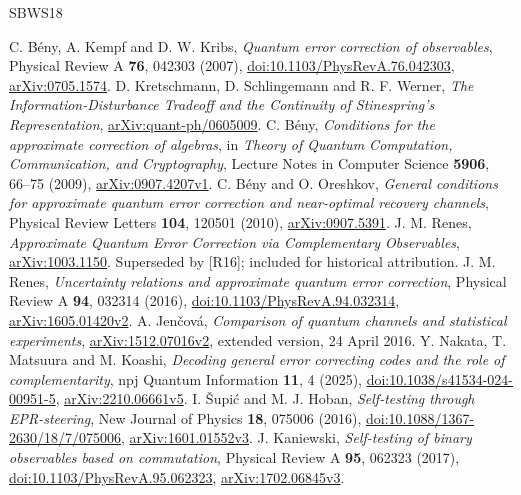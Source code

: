 \documentclass[11pt]{article}
\begin{document}
\begin{thebibliography}{SBWS18}\raggedright
{} C. Bény, A. Kempf and D. W. Kribs, \emph{Quantum error correction of observables}, Physical Review A \textbf{76}, 042303 (2007), \href{https://doi.org/10.1103/PhysRevA.76.042303}{doi:10.1103/PhysRevA.76.042303}, \href{https://arxiv.org/abs/0705.1574}{arXiv:0705.1574}.
 D. Kretschmann, D. Schlingemann and R. F. Werner, \emph{The Information-Disturbance Tradeoff and the Continuity of Stinespring's Representation}, \href{https://arxiv.org/abs/quant-ph/0605009}{arXiv:quant-ph/0605009}.
 C. Bény, \emph{Conditions for the approximate correction of algebras}, in \emph{Theory of Quantum Computation, Communication, and Cryptography}, Lecture Notes in Computer Science \textbf{5906}, 66--75 (2009), \href{https://arxiv.org/abs/0907.4207v1}{arXiv:0907.4207v1}.
 C. Bény and O. Oreshkov, \emph{General conditions for approximate quantum error correction and near-optimal recovery channels}, Physical Review Letters \textbf{104}, 120501 (2010), \href{https://arxiv.org/abs/0907.5391}{arXiv:0907.5391}.
 J. M. Renes, \emph{Approximate Quantum Error Correction via Complementary Observables}, \href{https://arxiv.org/abs/1003.1150}{arXiv:1003.1150}. Superseded by [R16]; included for historical attribution.
 J. M. Renes, \emph{Uncertainty relations and approximate quantum error correction}, Physical Review A \textbf{94}, 032314 (2016), \href{https://doi.org/10.1103/PhysRevA.94.032314}{doi:10.1103/PhysRevA.94.032314}, \href{https://arxiv.org/abs/1605.01420v2}{arXiv:1605.01420v2}.
 A. Jenčová, \emph{Comparison of quantum channels and statistical experiments}, \href{https://arxiv.org/abs/1512.07016v2}{arXiv:1512.07016v2}, extended version, 24 April 2016.
 Y. Nakata, T. Matsuura and M. Koashi, \emph{Decoding general error correcting codes and the role of complementarity}, npj Quantum Information \textbf{11}, 4 (2025), \href{https://doi.org/10.1038/s41534-024-00951-5}{doi:10.1038/s41534-024-00951-5}, \href{https://arxiv.org/abs/2210.06661v5}{arXiv:2210.06661v5}.
 I. Šupić and M. J. Hoban, \emph{Self-testing through EPR-steering}, New Journal of Physics \textbf{18}, 075006 (2016), \href{https://doi.org/10.1088/1367-2630/18/7/075006}{doi:10.1088/1367-2630/18/7/075006}, \href{https://arxiv.org/abs/1601.01552v3}{arXiv:1601.01552v3}.
 J. Kaniewski, \emph{Self-testing of binary observables based on commutation}, Physical Review A \textbf{95}, 062323 (2017), \href{https://doi.org/10.1103/PhysRevA.95.062323}{doi:10.1103/PhysRevA.95.062323}, \href{https://arxiv.org/abs/1702.06845v3}{arXiv:1702.06845v3}.

\end{thebibliography}
\end{document}
